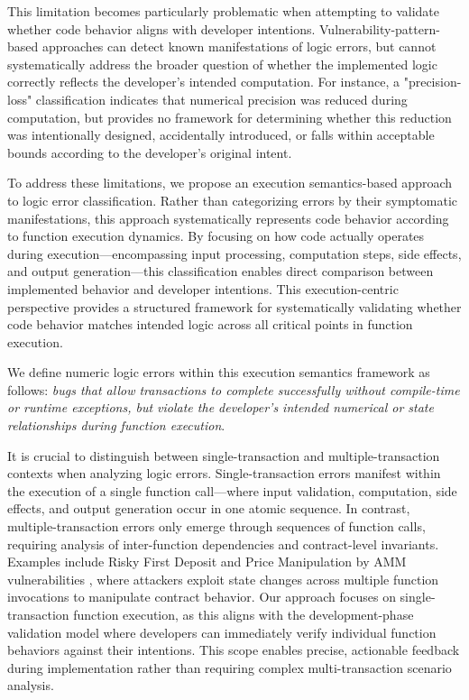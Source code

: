 \documentclass[pdflatex,sn-basic]{sn-jnl}%
\theoremstyle{thmstyleone}%
\theoremstyle{thmstyletwo}%
\theoremstyle{thmstylethree}%
\begin{document}
This limitation becomes particularly problematic when attempting to validate whether code behavior aligns with developer intentions.
Vulnerability-pattern-based approaches can detect known manifestations of logic errors,
but cannot systematically address the broader question of whether the implemented logic correctly reflects the developer's intended computation.
For instance, a "precision-loss" classification indicates that numerical precision was reduced during computation,
but provides no framework for determining whether this reduction was intentionally designed, accidentally introduced,
or falls within acceptable bounds according to the developer's original intent.

To address these limitations, we propose an execution semantics-based approach to logic error classification.
Rather than categorizing errors by their symptomatic manifestations, this approach systematically represents code behavior according to function execution dynamics.
By focusing on how code actually operates during execution---encompassing input processing, computation steps, side effects,
and output generation---this classification enables direct comparison between implemented behavior and developer intentions.
This execution-centric perspective provides a structured framework for systematically validating
whether code behavior matches intended logic across all critical points in function execution.

We define numeric logic errors within this execution semantics framework as follows:
\textit{bugs that allow transactions to complete successfully without compile-time or runtime exceptions,
    but violate the developer's intended numerical or state relationships during function execution}.

It is crucial to distinguish between single-transaction and multiple-transaction contexts when analyzing logic errors.
Single-transaction errors manifest within the execution of a single function call---where input validation, computation, side effects, and output generation occur in one atomic sequence.
In contrast, multiple-transaction errors only emerge through sequences of function calls, requiring analysis of inter-function dependencies and contract-level invariants.
Examples include Risky First Deposit and Price Manipulation by AMM vulnerabilities \citep{gptscan, exploitablebugs}, where attackers exploit state changes across multiple function invocations to manipulate contract behavior.
Our approach focuses on single-transaction function execution, as this aligns with the development-phase validation model where developers can immediately verify individual function behaviors against their intentions.
This scope enables precise, actionable feedback during implementation rather than requiring complex multi-transaction scenario analysis.
\end{document}
